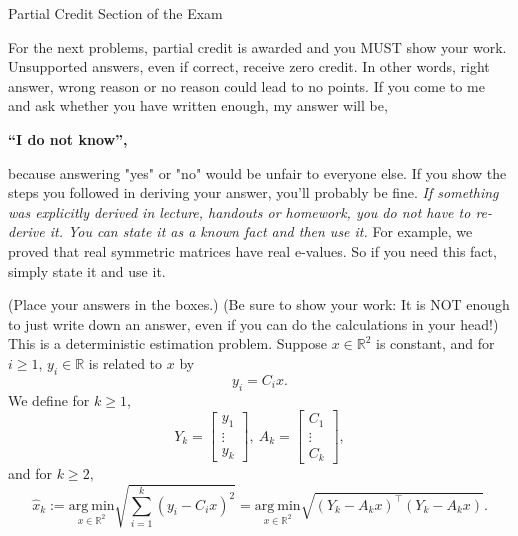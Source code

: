 \documentclass[letterpaper]{article}
\newcommand{\real}{\mathbb R}  %
\begin{document}
\newpage

\vspace*{.7in}
\begin{center}
\huge

Partial Credit Section of the Exam

\end{center}



\vspace*{1in}

{\Large  For the next problems, partial credit is awarded and you MUST show your work. Unsupported answers, even if correct, receive zero credit. In other words, right answer, wrong
reason or no reason could lead to no points. If you come to me and ask whether you have written enough, my answer will be,
\begin{center}
\bf ``I do not know'',
\end{center}
 because answering "yes" or "no"  would be unfair to everyone else. If you show the steps you followed in deriving your answer, you'll probably be fine.
  \emph{If something was explicitly derived in lecture, handouts or homework, you do not have to re-derive it. You can state it as a known fact and then use it.} For example, we proved that real symmetric matrices have real e-values. So if you need this fact, simply state it and use it.}

%
%



  \newpage


 (Place your answers in the boxes.) (Be sure to show your work: It is NOT enough to just write down an answer, even if you can do the calculations in your head!) This is a deterministic estimation problem. Suppose $x \in \real^2$ is constant, and for $i \ge 1$, $y_i \in \real$ is related to $x$ by
$$y_i = C_i x.$$
We define for $k\ge 1$,
$$ Y_k =\left[ \begin{array}{c} y_1 \\ \vdots \\ y_k \end{array} \right],~   A_k = \left[ \begin{array}{c} C_1 \\ \vdots \\ C_k  \end{array}  \right],$$
and for $k \ge 2,$ $$ \widehat{x}_k :=\underset{x \in \real^2} {\mathrm{arg~min} }\sqrt{\sum_{i=1}^k \left(y_i - C_i x \right)^2}=\underset{x \in \real^2} {\mathrm{arg~min} } \sqrt{(Y_k - A_k x)^\top (Y_k - A_k x)}.$$
\end{document}
